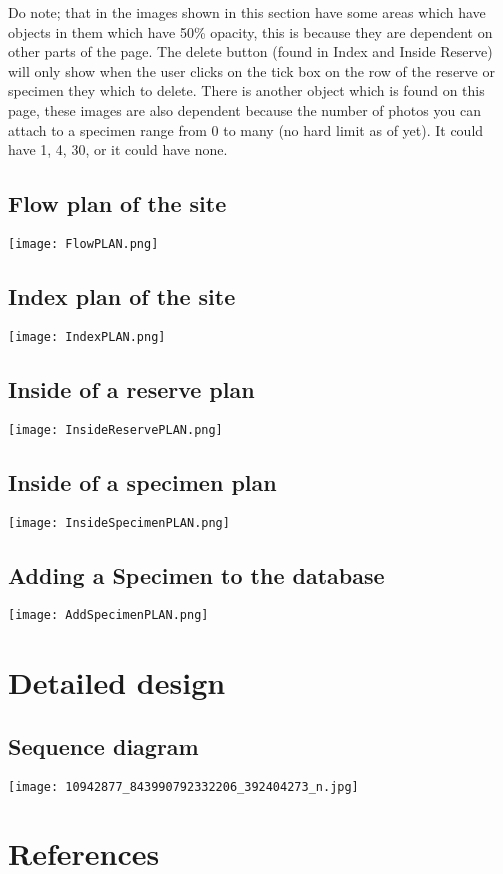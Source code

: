 \documentclass[12pt]{article}
\begin{document}
Do note; that in the images shown in this section have some areas which have objects in them which have 50\% opacity, this is because they are dependent on other parts of the page. The delete button (found in Index and Inside Reserve) will only show when the user clicks on the tick box on the row of the reserve or specimen they which to delete. There is another object which is found on this page, these images are also dependent because the number of photos you can attach to a specimen range from 0 to many (no hard limit as of yet). It could have 1, 4, 30, or it could have none.

\subsection{Flow plan of the site}
\texttt{[image: FlowPLAN.png]}

\subsection{Index plan of the site}
\texttt{[image: IndexPLAN.png]}

\subsection{Inside of a reserve plan}
\texttt{[image: InsideReservePLAN.png]}

\subsection{Inside of a specimen plan}
\texttt{[image: InsideSpecimenPLAN.png]}

\subsection{Adding a Specimen to the database}
\texttt{[image: AddSpecimenPLAN.png]}

\section{Detailed design}
  \subsection{Sequence diagram}
    \texttt{[image: 10942877\_843990792332206\_392404273\_n.jpg]}


\section{References}


\begin{versionhistory}

\end{versionhistory}
\end{document}
